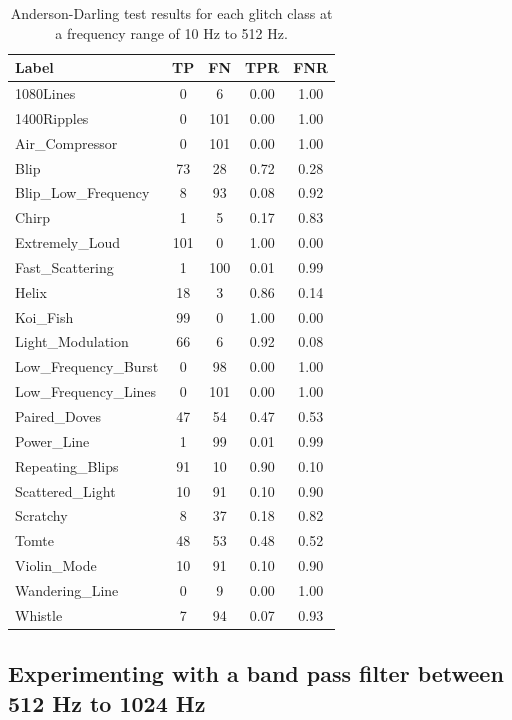 \documentclass[12pt]{article}
\begin{document}
\begin{table}[H]
  \centering
  \begin{tabular}{lcccc}
  \toprule
  Label & TP & FN & TPR & FNR \\
  \midrule
  1080Lines & 0 & 6 & 0.00 & 1.00 \\
  1400Ripples & 0 & 101 & 0.00 & 1.00 \\
  Air\_Compressor & 0 & 101 & 0.00 & 1.00 \\
  Blip & 73 & 28 & 0.72 & 0.28 \\
  Blip\_Low\_Frequency & 8 & 93 & 0.08 & 0.92 \\
  Chirp & 1 & 5 & 0.17 & 0.83 \\
  Extremely\_Loud & 101 & 0 & 1.00 & 0.00 \\
  Fast\_Scattering & 1 & 100 & 0.01 & 0.99 \\
  Helix & 18 & 3 & 0.86 & 0.14 \\
  Koi\_Fish & 99 & 0 & 1.00 & 0.00 \\
  Light\_Modulation & 66 & 6 & 0.92 & 0.08 \\
  Low\_Frequency\_Burst & 0 & 98 & 0.00 & 1.00 \\
  Low\_Frequency\_Lines & 0 & 101 & 0.00 & 1.00 \\
  Paired\_Doves & 47 & 54 & 0.47 & 0.53 \\
  Power\_Line & 1 & 99 & 0.01 & 0.99 \\
  Repeating\_Blips & 91 & 10 & 0.90 & 0.10 \\
  Scattered\_Light & 10 & 91 & 0.10 & 0.90  \\
  Scratchy & 8 & 37 & 0.18 & 0.82  \\
  Tomte & 48 & 53 & 0.48 & 0.52 \\
  Violin\_Mode & 10 & 91 & 0.10 & 0.90 \\
  Wandering\_Line & 0 & 9 & 0.00 & 1.00 \\
  Whistle & 7 & 94 & 0.07 & 0.93 \\
  \bottomrule
  \end{tabular}
  \caption{Anderson-Darling test results for each glitch class at a frequency range of 10 Hz to 512 Hz.}
  \label{tab:ad_low_frequency_results}
\end{table}

\subsection{Experimenting with a band pass filter between 512 Hz to 1024 Hz}\label{Experiment_3}
\end{document}

